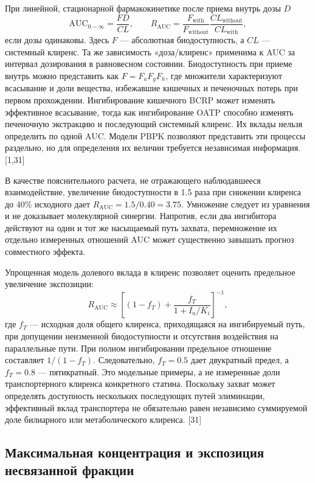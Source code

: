 \documentclass[11pt]{article}
\begin{document}
При линейной, стационарной фармакокинетике после приема внутрь дозы \(D\)
\[
\mathrm{AUC}_{0-\infty}=\frac{F D}{CL},
\qquad
R_{\mathrm{AUC}}=
\frac{F_{\mathrm{with}}}{F_{\mathrm{without}}}
\frac{CL_{\mathrm{without}}}{CL_{\mathrm{with}}},
\]
если дозы одинаковы. Здесь \(F\) --- абсолютная биодоступность, а \(CL\) --- системный клиренс. Та же зависимость «доза/клиренс» применима к AUC за интервал дозирования в равновесном состоянии. Биодоступность при приеме внутрь можно представить как \(F=F_aF_gF_h\), где множители характеризуют всасывание и доли вещества, избежавшие кишечных и печеночных потерь при первом прохождении. Ингибирование кишечного BCRP может изменять эффективное всасывание, тогда как ингибирование OATP способно изменять печеночную экстракцию и последующий системный клиренс. Их вклады нельзя определить по одной AUC. Модели PBPK позволяют представить эти процессы раздельно, но для определения их величин требуется независимая информация. [1,31]

В качестве пояснительного расчета, не отражающего наблюдавшееся взаимодействие, увеличение биодоступности в 1.5 раза при снижении клиренса до 40\% исходного дает \(R_{\mathrm{AUC}}=1.5/0.40=3.75\). Умножение следует из уравнения и не доказывает молекулярной синергии. Напротив, если два ингибитора действуют на один и тот же насыщаемый путь захвата, перемножение их отдельно измеренных отношений AUC может существенно завышать прогноз совместного эффекта.

Упрощенная модель долевого вклада в клиренс позволяет оценить предельное увеличение экспозиции:
\[
R_{\mathrm{AUC}}\approx
\left[(1-f_T)+\frac{f_T}{1+I_u/K_i}\right]^{-1},
\]
где \(f_T\) --- исходная доля общего клиренса, приходящаяся на ингибируемый путь, при допущении неизменной биодоступности и отсутствия воздействия на параллельные пути. При полном ингибировании предельное отношение составляет \(1/(1-f_T)\). Следовательно, \(f_T=0.5\) дает двукратный предел, а \(f_T=0.8\) --- пятикратный. Это модельные примеры, а не измеренные доли транспортерного клиренса конкретного статина. Поскольку захват может определять доступность нескольких последующих путей элиминации, эффективный вклад транспортера не обязательно равен независимо суммируемой доле билиарного или метаболического клиренса. [31]

\subsection{Максимальная концентрация и экспозиция несвязанной фракции}
\end{document}
